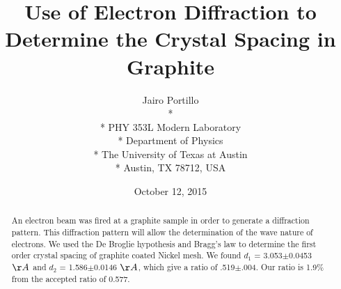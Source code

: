 \documentclass[11pt,letterpaper,onecolumn]{article}
\begin{document}

\title{\bf Use of Electron Diffraction to Determine the Crystal Spacing in Graphite}

\author{
 Jairo Portillo \\*
  \\*
 PHY 353L Modern Laboratory \\*
 Department of Physics \\*
 The University of Texas at Austin \\*
 Austin, TX 78712, USA
}
\date{October 12, 2015}


\maketitle


\begin{abstract}

An electron beam was fired at a graphite sample in order to generate a diffraction pattern. This diffraction pattern will allow the determination of the wave nature of electrons. We used the De Broglie hypothesis and Bragg's law to determine the first order crystal spacing of graphite coated Nickel mesh. We found $d_{1}$ = 3.053$\pm$0.0453 $\AA$ and $d_{2}$ = 1.586$\pm$0.0146 $\AA$, which give a ratio of .519$\pm$.004. Our ratio is 1.9$\%$ from the accepted ratio of 0.577.

\end{abstract}


\end{document}

